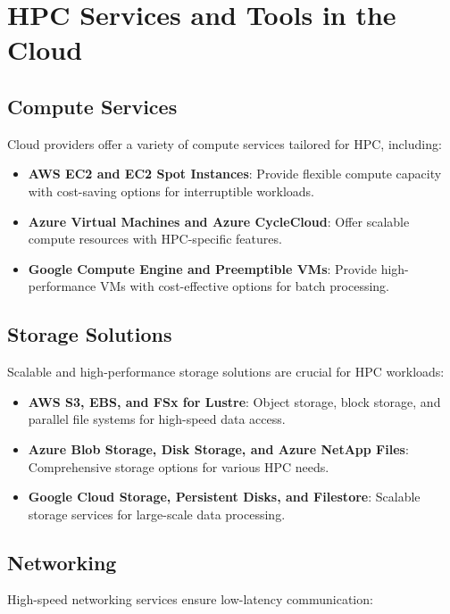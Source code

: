 \section{HPC Services and Tools in the Cloud}

\subsection{Compute Services}

Cloud providers offer a variety of compute services tailored for HPC, including:

\begin{itemize}
    \item \textbf{AWS EC2 and EC2 Spot Instances}: Provide flexible compute capacity with cost-saving options for interruptible workloads.
    \item \textbf{Azure Virtual Machines and Azure CycleCloud}: Offer scalable compute resources with HPC-specific features.
    \item \textbf{Google Compute Engine and Preemptible VMs}: Provide high-performance VMs with cost-effective options for batch processing.
\end{itemize}

\subsection{Storage Solutions}

Scalable and high-performance storage solutions are crucial for HPC workloads:

\begin{itemize}
    \item \textbf{AWS S3, EBS, and FSx for Lustre}: Object storage, block storage, and parallel file systems for high-speed data access.
    \item \textbf{Azure Blob Storage, Disk Storage, and Azure NetApp Files}: Comprehensive storage options for various HPC needs.
    \item \textbf{Google Cloud Storage, Persistent Disks, and Filestore}: Scalable storage services for large-scale data processing.
\end{itemize}

\subsection{Networking}

High-speed networking services ensure low-latency communication:

